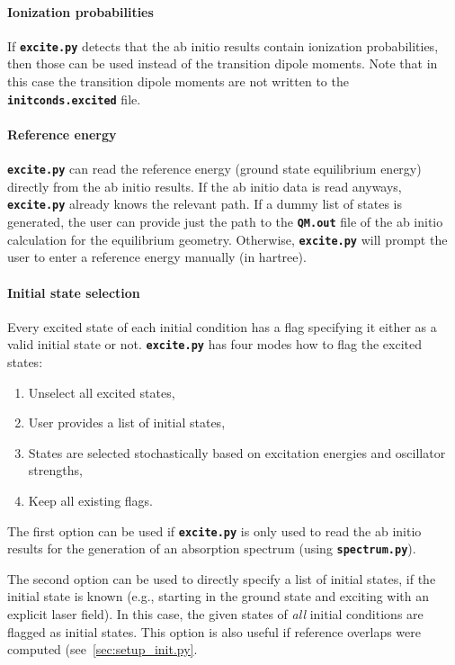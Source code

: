 \documentclass[a4paper,10pt,DIV=15,openany]{scrbook}
\newcommand{\ttt}[1]{\textbf{\texttt{#1}}}
\begin{document}
\paragraph{Ionization probabilities}

If \ttt{excite.py} detects that the ab initio results contain ionization probabilities, then those can be used instead of the transition dipole moments. Note that in this case the transition dipole moments are not written to the \ttt{initconds.excited} file. 

\paragraph{Reference energy}

\ttt{excite.py} can read the reference energy (ground state equilibrium energy) directly from the ab initio results. If the ab initio data is read anyways, \ttt{excite.py} already knows the relevant path. If a dummy list of states is generated, the user can provide just the path to the \ttt{QM.out} file of the ab initio calculation for the equilibrium geometry. Otherwise, \ttt{excite.py} will prompt the user to enter a reference energy manually (in hartree).

\paragraph{Initial state selection}

Every excited state of each initial condition has a flag specifying it either as a valid initial state or not. \ttt{excite.py} has four modes how to flag the excited states:
\begin{enumerate}
  \item Unselect all excited states,
  \item User provides a list of initial states,
  \item States are selected stochastically based on excitation energies and oscillator strengths,
  \item Keep all existing flags.
\end{enumerate}
The first option can be used if \ttt{excite.py} is only used to read the ab initio results for the generation of an absorption spectrum (using \ttt{spectrum.py}). 

The second option can be used to directly specify a list of initial states, if the initial state is known (e.g., starting in the ground state and exciting with an explicit laser field). In this case, the given states of \textit{all} initial conditions are flagged as initial states. This option is also useful if reference overlaps were computed (see~\ref{sec:setup_init.py}.
\end{document}
